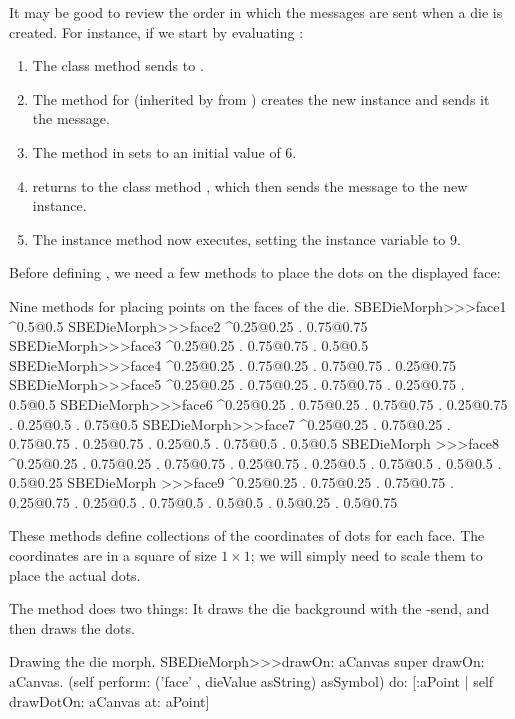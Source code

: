 \documentclass[a4paper,10pt,twoside]{book}
\begin{document}
It may be good to review the order in which the messages are sent when a die is created.
For instance, if we start by evaluating :
\begin{enumerate}
	\item The class method  sends  to .
	\item The method for  (inherited by  from ) creates the new instance and sends it the  message.
	\item The  method in  sets  to an initial value of 6.
	\item {} returns to the class method , which then sends the message  to the new instance.
	\item The instance method  now executes, setting the  instance variable to 9.
\end{enumerate}

Before defining , we need a few methods to place the dots on the displayed face:
\begin{methods}{Nine methods for placing points on the faces of the die.}
SBEDieMorph>>>face1
	^{0.5@0.5}
SBEDieMorph>>>face2
	^{0.25@0.25 . 0.75@0.75}
SBEDieMorph>>>face3
	^{0.25@0.25 . 0.75@0.75 . 0.5@0.5}
SBEDieMorph>>>face4
	^{0.25@0.25 . 0.75@0.25 . 0.75@0.75 . 0.25@0.75}
SBEDieMorph>>>face5
	^{0.25@0.25 . 0.75@0.25 . 0.75@0.75 . 0.25@0.75 . 0.5@0.5}
SBEDieMorph>>>face6
	^{0.25@0.25 . 0.75@0.25 . 0.75@0.75 . 0.25@0.75 . 0.25@0.5 . 0.75@0.5}
SBEDieMorph>>>face7
	^{0.25@0.25 . 0.75@0.25 . 0.75@0.75 . 0.25@0.75 . 0.25@0.5 . 0.75@0.5 . 0.5@0.5}
SBEDieMorph >>>face8
	^{0.25@0.25 . 0.75@0.25 . 0.75@0.75 . 0.25@0.75 . 0.25@0.5 . 0.75@0.5 . 0.5@0.5 . 0.5@0.25}
SBEDieMorph >>>face9
	^{0.25@0.25 . 0.75@0.25 . 0.75@0.75 . 0.25@0.75 . 0.25@0.5 . 0.75@0.5 . 0.5@0.5 . 0.5@0.25 . 0.5@0.75}
\end{methods}

These methods define collections of the coordinates of dots for each face.
The coordinates are in a square of size $1 \times 1$; we will simply need to scale them to place the actual dots.

The  method does two things:
It draws the die background with the -send, and then draws the dots.
\begin{method}{Drawing the die morph.}
SBEDieMorph>>>drawOn: aCanvas
	super drawOn: aCanvas.
	(self perform: ('face' , dieValue asString) asSymbol)
		do: [:aPoint | self drawDotOn: aCanvas at: aPoint]
\end{method}
\end{document}
